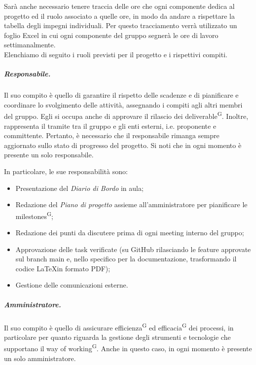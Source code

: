Sarà anche necessario tenere traccia delle ore che ogni componente dedica al progetto ed il ruolo associato a quelle ore, in modo da andare a rispettare la tabella degli impegni individuali. Per questo tracciamento verrà utilizzato un foglio Excel in cui ogni componente del gruppo segnerà le ore di lavoro settimanalmente.\\

\noindent Elenchiamo di seguito i ruoli previsti per il progetto e i rispettivi compiti.
\subparagraph{Responsabile.}
Il suo compito è quello di garantire il rispetto delle scadenze e di pianificare e coordinare lo svolgimento delle attività, assegnando i compiti agli altri membri del gruppo. Egli si occupa anche di approvare il rilascio dei deliverable\textsuperscript{G}.
Inoltre, rappresenta il tramite tra il gruppo e gli enti esterni, i.e. proponente e committente. Pertanto, è necessario che il responsabile rimanga sempre aggiornato sullo stato di progresso del progetto. Si noti che in ogni momento è presente un solo responsabile.

In particolare, le sue responsabilità sono:
\begin{itemize}
    \item Presentazione del \textit{Diario di Bordo} in aula;
    \item Redazione del \textit{Piano di progetto} %
    assieme all'amministratore per pianificare le milestones\textsuperscript{G};
    \item Redazione dei punti da discutere prima di ogni meeting interno del gruppo;
    \item Approvazione delle task verificate (su GitHub rilasciando le feature approvate sul branch main e, nello specifico per la documentazione, trasformando il codice \LaTeX\space in formato PDF);
    \item Gestione delle comunicazioni esterne.
\end{itemize}

\subparagraph{Amministratore.}
Il suo compito è quello di assicurare efficienza\textsuperscript{G} ed efficacia\textsuperscript{G} dei processi, in particolare per quanto riguarda la gestione degli strumenti e tecnologie che supportano il way of working\textsuperscript{G}. Anche in questo caso, in ogni momento è presente un solo amministratore.

